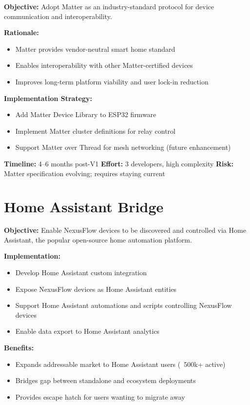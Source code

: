 \textbf{Objective:} Adopt Matter as an industry-standard protocol for device communication and interoperability.

\textbf{Rationale:}
\begin{itemize}
    \item Matter provides vendor-neutral smart home standard
    \item Enables interoperability with other Matter-certified devices
    \item Improves long-term platform viability and user lock-in reduction
\end{itemize}

\textbf{Implementation Strategy:}
\begin{itemize}
    \item Add Matter Device Library to ESP32 firmware
    \item Implement Matter cluster definitions for relay control
    \item Support Matter over Thread for mesh networking (future enhancement)
\end{itemize}

\textbf{Timeline:} 4–6 months post-V1
\textbf{Effort:} 3 developers, high complexity
\textbf{Risk:} Matter specification evolving; requires staying current

\section{Home Assistant Bridge}

\textbf{Objective:} Enable NexusFlow devices to be discovered and controlled via Home Assistant, the popular open-source home automation platform.

\textbf{Implementation:}
\begin{itemize}
    \item Develop Home Assistant custom integration
    \item Expose NexusFlow devices as Home Assistant entities
    \item Support Home Assistant automations and scripts controlling NexusFlow devices
    \item Enable data export to Home Assistant analytics
\end{itemize}

\textbf{Benefits:}
\begin{itemize}
    \item Expands addressable market to Home Assistant users (~500k+ active)
    \item Bridges gap between standalone and ecosystem deployments
    \item Provides escape hatch for users wanting to migrate away
\end{itemize}

